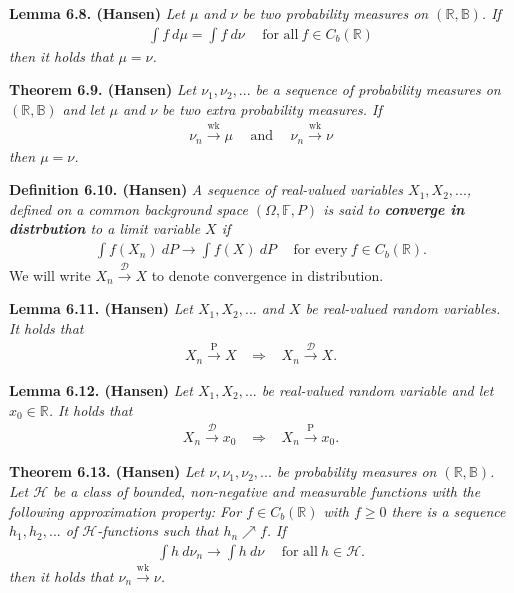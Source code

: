 \documentclass[a4paper,12pt,openany]{book}
\begin{document}
\textbf{Lemma 6.8. (Hansen)} \emph{Let \(\mu\) and \(\nu\) be two probability measures on \((\mathbb{R},\mathbb{B})\). If}
\begin{align*}
    \int f\ d\mu=\int f\ d\nu\hspace{15pt}\text{for all}\ f\in C_b(\mathbb{R})\tag{6.7}
\end{align*}
\emph{then it holds that \(\mu=\nu\).}

\textbf{Theorem 6.9. (Hansen)} \emph{Let \(\nu_1,\nu_2,...\) be a sequence of probability measures on \((\mathbb{R},\mathbb{B})\) and let \(\mu\) and \(\nu\) be two extra probability measures. If}
\begin{align*}
    \nu_n\stackrel{\text{wk}}{\to} \mu\hspace{15pt}\text{and}\hspace{15pt}\nu_n\stackrel{\text{wk}}{\to} \nu
\end{align*}
\emph{then \(\mu=\nu\).}

\textbf{Definition 6.10. (Hansen)} \emph{A sequence of real-valued variables \(X_1,X_2,...\), defined on a common background space \((\Omega,\mathbb{F},P)\) is said to \textbf{converge in distrbution} to a limit variable \(X\) if}
\begin{align*}
    \int f(X_n)\ dP\to \int f(X)\ dP\hspace{15pt}\text{for every}\ f\in C_b(\mathbb{R}).\tag{6.9}
\end{align*}
We will write \(X_n\stackrel{\mathcal{D}}{\to} X\) to denote convergence in distribution.

\textbf{Lemma 6.11. (Hansen)} \emph{Let \(X_1,X_2,...\) and \(X\) be real-valued random variables. It holds that}
\begin{align*}
    X_n\stackrel{\text{P}}{\to} X\hspace{10pt}\Rightarrow\hspace{10pt} X_n\stackrel{\mathcal{D}}{\to} X.
\end{align*}

\textbf{Lemma 6.12. (Hansen)} \emph{Let \(X_1,X_2,...\) be real-valued random variable and let \(x_0\in\mathbb{R}\). It holds that}
\begin{align*}
    X_n\stackrel{\mathcal{D}}{\to} x_0\hspace{10pt}\Rightarrow\hspace{10pt} X_n\stackrel{\text{P}}{\to} x_0.
\end{align*}

\textbf{Theorem 6.13. (Hansen)} \emph{Let \(\nu,\nu_1,\nu_2,...\) be probability measures on \((\mathbb{R},\mathbb{B})\). Let \(\mathcal{H}\) be a class of bounded, non-negative and measurable functions with the following approximation property: For \(f\in C_b(\mathbb{R})\) with \(f\ge 0\) there is a sequence \(h_1,h_2,...\) of \(\mathcal{H}\)-functions such that \(h_n\nearrow f\). If}
\begin{align*}
    \int h\ d\nu_n\to \int h\ d\nu\hspace{15pt}\text{for all}\ h\in\mathcal{H}.\tag{6.11}
\end{align*}
\emph{then it holds that \(\nu_n\stackrel{\text{wk}}{\to} \nu\).}
\end{document}
